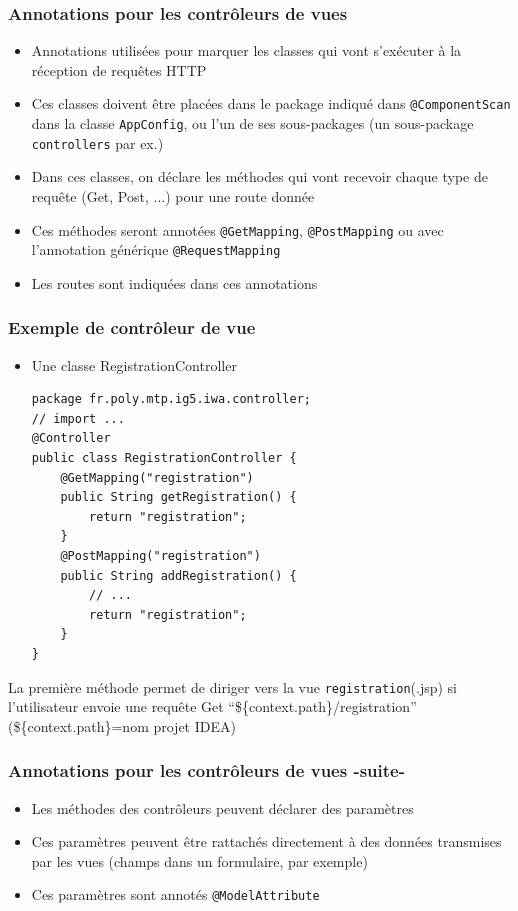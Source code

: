 \documentclass{beamer}
\begin{document}
\begin{frame}
	\frametitle{Annotations pour les contrôleurs de vues}
	\begin{itemize}
		\item Annotations utilisées pour marquer les classes qui vont s'exécuter à la réception de requêtes HTTP
		\item Ces classes doivent être placées dans le package indiqué dans \texttt{@ComponentScan} dans la classe \texttt{AppConfig}, ou l'un de ses sous-packages (un sous-package \texttt{controllers} par ex.)
		\item Dans ces classes, on déclare les méthodes qui vont recevoir chaque type de requête (Get, Post, ...) pour une route donnée
		\item Ces méthodes seront annotées \texttt{@GetMapping}, \texttt{@PostMapping} ou avec l'annotation générique \texttt{@RequestMapping}
		\item Les routes sont indiquées dans ces annotations 
	\end{itemize}
\end{frame}


\begin{frame}[fragile]
	\frametitle{Exemple de contrôleur de vue}
\begin{itemize}
	\item Une classe RegistrationController
\begin{lstlisting}
package fr.poly.mtp.ig5.iwa.controller;
// import ... 
@Controller
public class RegistrationController {
	@GetMapping("registration")
	public String getRegistration() {
		return "registration";
	}
	@PostMapping("registration")
	public String addRegistration() {
		// ...
		return "registration";
	}
}
\end{lstlisting}
\end{itemize}
La première méthode permet de diriger vers la vue \texttt{registration}(.jsp) si l'utilisateur envoie une requête Get ``\$\{context.path\}/registration'' (\$\{context.path\}=nom projet IDEA)
\end{frame}

\begin{frame}
\frametitle{Annotations pour les contrôleurs de vues -suite-}
\begin{itemize}
		\item Les méthodes des contrôleurs peuvent déclarer des paramètres 
		\item Ces paramètres peuvent être rattachés directement à des données transmises par les vues (champs dans un formulaire, par exemple)
		\item Ces paramètres sont annotés \texttt{@ModelAttribute}
	\end{itemize}
\end{frame}
\end{document}
